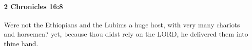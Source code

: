 
		\paragraph{2 Chronicles 16:8} %
			\label{2CHRONICLES-16-8}

			Were not the Ethiopians and the Lubims a huge host, with very many chariots and horsemen? yet, because thou didst rely on the LORD, he delivered them into thine hand.


